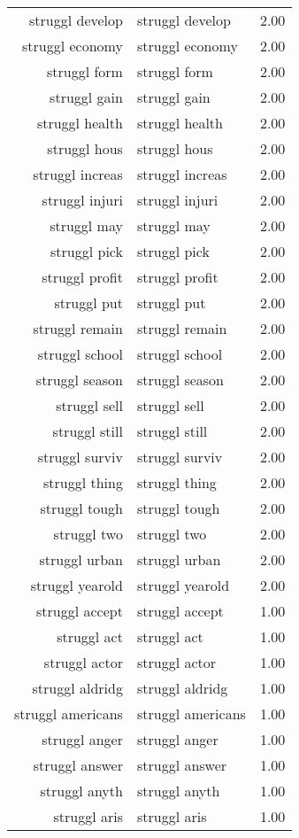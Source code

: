 \begin{table}[ht]
\begin{tabular}{rlr}
  struggl develop & struggl develop & 2.00 \\ 
  struggl economy & struggl economy & 2.00 \\ 
  struggl form & struggl form & 2.00 \\ 
  struggl gain & struggl gain & 2.00 \\ 
  struggl health & struggl health & 2.00 \\ 
  struggl hous & struggl hous & 2.00 \\ 
  struggl increas & struggl increas & 2.00 \\ 
  struggl injuri & struggl injuri & 2.00 \\ 
  struggl may & struggl may & 2.00 \\ 
  struggl pick & struggl pick & 2.00 \\ 
  struggl profit & struggl profit & 2.00 \\ 
  struggl put & struggl put & 2.00 \\ 
  struggl remain & struggl remain & 2.00 \\ 
  struggl school & struggl school & 2.00 \\ 
  struggl season & struggl season & 2.00 \\ 
  struggl sell & struggl sell & 2.00 \\ 
  struggl still & struggl still & 2.00 \\ 
  struggl surviv & struggl surviv & 2.00 \\ 
  struggl thing & struggl thing & 2.00 \\ 
  struggl tough & struggl tough & 2.00 \\ 
  struggl two & struggl two & 2.00 \\ 
  struggl urban & struggl urban & 2.00 \\ 
  struggl yearold & struggl yearold & 2.00 \\ 
  struggl accept & struggl accept & 1.00 \\ 
  struggl act & struggl act & 1.00 \\ 
  struggl actor & struggl actor & 1.00 \\ 
  struggl aldridg & struggl aldridg & 1.00 \\ 
  struggl americans & struggl americans & 1.00 \\ 
  struggl anger & struggl anger & 1.00 \\ 
  struggl answer & struggl answer & 1.00 \\ 
  struggl anyth & struggl anyth & 1.00 \\ 
  struggl aris & struggl aris & 1.00 \\ 

\end{tabular}
\end{table}
